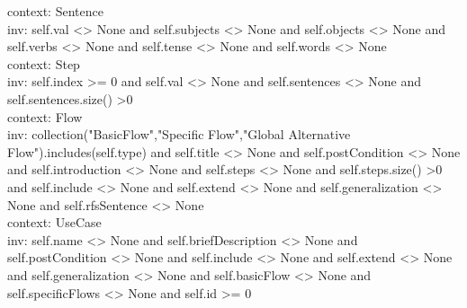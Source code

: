   	context: Sentence\\
   	inv: self.val <> None and self.subjects <> None and self.objects <> None and self.verbs <> None and self.tense <> None and self.words <> None\\
   	context: Step\\
   	inv: self.index >= 0 and self.val <> None and self.sentences <> None and self.sentences.size() >0\\
   	context: Flow\\
   	inv: collection("BasicFlow","Specific Flow","Global Alternative Flow").includes(self.type) and self.title <> None and self.postCondition <> None and self.introduction <> None 	and self.steps <> None and self.steps.size() >0 and self.include <> None and self.extend <> None and self.generalization <> None and self.rfsSentence <> None\\
   	context: UseCase\\
   	inv: self.name <> None and self.briefDescription <> None and self.postCondition <> None and self.include <> None and self.extend <> None and self.generalization <> None	and self.basicFlow <> None and self.specificFlows <> None and self.id >= 0
   	
   
